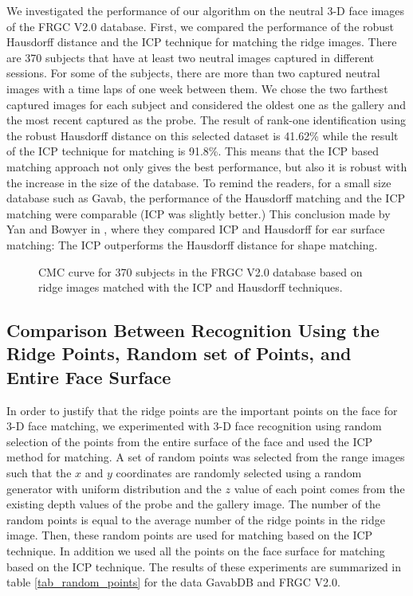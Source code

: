 We investigated the performance of our algorithm on the neutral 3-D
face images of the FRGC V2.0 database. First, we compared the
performance of the robust Hausdorff distance and the ICP technique
for matching the ridge images. There are 370 subjects that have at
least two neutral images captured in different sessions. For some of
the subjects, there are more than two captured neutral images with a
time laps of one week between them. We chose the two farthest
captured images for each subject and considered the oldest one as
the gallery and the most recent captured as the probe. The result of
rank-one identification using the robust Hausdorff distance on this
selected dataset is 41.62\% while the result of the ICP technique
for matching is 91.8\%. This means that the ICP based matching
approach not only gives the best performance, but also it is robust
with the increase in the size of the database. To remind the
readers, for a small size database such as Gavab, the performance of
the Hausdorff matching and the ICP matching were comparable (ICP was
slightly better.) This conclusion made by Yan and Bowyer in
\cite{Yan05}, where they compared ICP and Hausdorff for ear surface
matching: The ICP outperforms the Hausdorff distance for shape
matching.

\begin{figure}[tbp]
\begin{center}
\caption{CMC curve for 370 subjects in the FRGC V2.0 database based
on ridge images matched with the ICP and Hausdorff techniques.}
\label{fig_cmc_frgc}
\end{center}
\end{figure}

\subsection{Comparison Between Recognition Using the Ridge Points, Random set of Points, and Entire Face Surface}
In order to justify that the ridge points are the important points
on the face for 3-D face matching, we experimented with 3-D face
recognition using random selection of the points from the entire
surface of the face and used the ICP method for matching. A set of
random points was selected from the range images such that the $x$
and $y$ coordinates are randomly selected using a random generator
with uniform distribution and the $z$ value of each point comes from
the existing depth values of the probe and the gallery image. The
number of the random points is equal to the average number of the
ridge points in the ridge image. Then, these random points are used
for matching based on the ICP technique. In addition we used all the
points on the face surface for matching based on the ICP technique.
The results of these experiments are summarized in table
\ref{tab_random_points} for the data GavabDB and FRGC V2.0.

